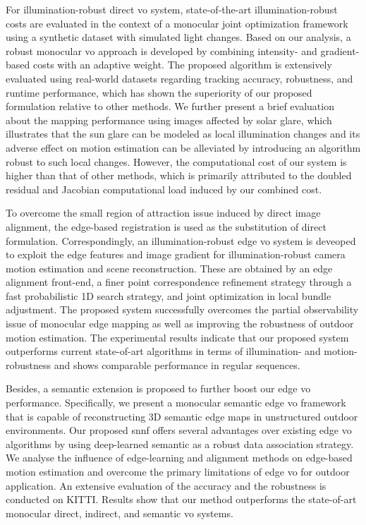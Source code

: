 For illumination-robust direct \acrshort{vo} system, state-of-the-art illumination-robust costs are evaluated in the context of a monocular joint optimization framework using a synthetic dataset with simulated light changes. 
Based on our analysis, a robust monocular \acrshort{vo} approach is developed by combining intensity- and gradient-based costs with an adaptive weight. 
The proposed algorithm is extensively evaluated using real-world datasets regarding tracking accuracy, robustness, and runtime performance, which has shown the superiority of our proposed formulation relative to other methods. 
We further present a brief evaluation about the mapping performance using images affected by solar glare, which illustrates that the sun glare can be modeled as local illumination changes and its adverse effect on motion estimation can be alleviated by introducing an algorithm robust to such local changes. 
However, the computational cost of our system is higher than that of other methods, which is primarily attributed to the doubled residual and Jacobian computational load induced by our combined cost.

To overcome the small region of attraction issue induced by direct image alignment, the edge-based registration is used as the substitution of direct formulation. 
Correspondingly, an illumination-robust edge \acrshort{vo} system is deveoped to exploit the edge features and image gradient for illumination-robust camera motion estimation and scene reconstruction. 
These are obtained by an edge alignment front-end, a finer point correspondence refinement strategy through a fast probabilistic 1D search strategy, and joint optimization in local bundle adjustment. 
The proposed system successfully overcomes the partial observability issue of monocular edge mapping as well as improving the robustness of outdoor motion estimation. 
The experimental results indicate that our proposed system outperforms current state-of-art algorithms in terms of illumination- and motion-robustness and shows comparable performance in regular sequences. 

Besides, a semantic extension is proposed to further boost our edge \acrshort{vo} performance. 
Specifically, we present a monocular semantic edge \acrshort{vo} framework that is capable of reconstructing 3D semantic edge maps in unstructured outdoor environments.  
Our proposed \acrshort{snnf} offers several advantages over existing edge \acrshort{vo} algorithms by using deep-learned semantic as a robust data association strategy. 
We analyse the influence of edge-learning and alignment methods on edge-based motion estimation and overcome the primary limitations of edge \acrshort{vo} for outdoor application. 
An extensive evaluation of the accuracy and the robustness is conducted on KITTI. 
Results show that our method outperforms the state-of-art monocular direct, indirect, and semantic \acrshort{vo} systems. 

